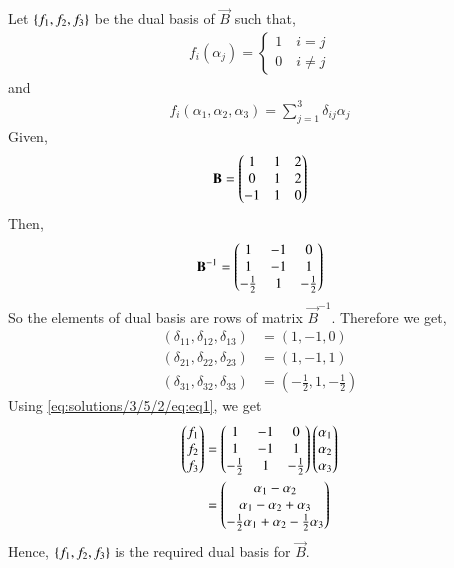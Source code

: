 Let $\left\{f_1, f_2, f_3\right\}$ be the dual basis of $\vec{B}$ such that,
\begin{align}
	f_i(\alpha_j) = \begin{cases}
		1 \quad i = j\\
		0 \quad i \not= j
	\end{cases}
\end{align}
and 
\begin{align}
	f_i(\alpha_1, \alpha_2, \alpha_3) = \sum_{j=1}^{3} \delta_{ij}\alpha_j \label{eq:solutions/3/5/2/eq:eq1}
\end{align}
Given,
\begin{align}
	\mathbf{B} = \begin{pmatrix}1 & 1 & 2\\ 0 & 1& 2 \\ -1 & 1& 0\end{pmatrix}
\end{align}
Then, 
\begin{align}
	\mathbf{B}^{-1} = \begin{pmatrix}1  & -1 & 0\\ 1 & -1 & 1\\ -\frac{1}{2} & 1 & -\frac{1}{2}\end{pmatrix}
\end{align}
So the elements of dual basis are rows of matrix $\vec{B}^{-1}$.
Therefore we get, 
\begin{align}
	(\delta_{11}, \delta_{12}, \delta_{13} ) &= (1, -1, 0)\\
	(\delta_{21}, \delta_{22}, \delta_{23} ) &= (1, -1, 1)\\
	(\delta_{31}, \delta_{32}, \delta_{33} ) &= (-\frac{1}{2}, 1, -\frac{1}{2})
\end{align}
Using \eqref{eq:solutions/3/5/2/eq:eq1}, we get 
\begin{align}
	\begin{pmatrix}f_1 \\ f_2 \\ f_3\end{pmatrix} &= \begin{pmatrix}1  & -1 & 0\\ 1 & -1 & 1\\ -\frac{1}{2} & 1 & -\frac{1}{2}\end{pmatrix} \begin{pmatrix}\alpha_1 \\ \alpha_2\\ \alpha_3\end{pmatrix}\\
	&= \begin{pmatrix}\alpha_1 - \alpha_2 \\ \alpha_1 - \alpha_2 + \alpha_3\\ -\frac{1}{2}\alpha_1 + \alpha_2 -\frac{1}{2} \alpha_3\end{pmatrix}
\end{align}
Hence, $\left\{f_1, f_2, f_3\right\}$ is the required dual basis for $\vec{B}$.
